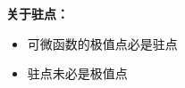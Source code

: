 \begin{shaded}
	{\bf 关于驻点：}
	
	\begin{itemize}
	  \item 可微函数的极值点必是驻点
	  \item 驻点未必是极值点 
	\end{itemize}
	
	\begin{center}
		\quad
	\end{center}
\end{shaded}

